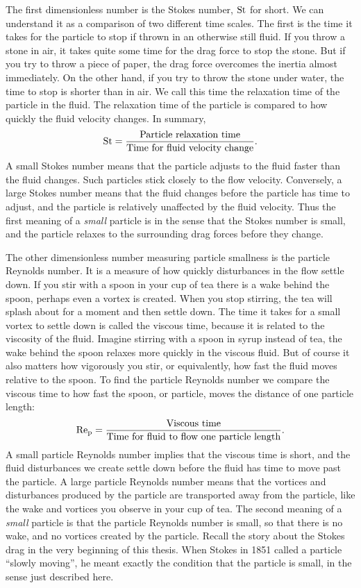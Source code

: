 \documentclass[thesis.tex]{subfiles}
\begin{document}
The first dimensionless number is the Stokes number, $\mbox{St}$ for short. We can understand it as a comparison of two different time scales. The first is the time it takes for the particle to stop if thrown in an otherwise still fluid. If you throw a stone in air, it takes quite some time for the drag force to stop the stone. But if you try to throw a piece of paper, the drag force overcomes the inertia almost immediately. On the other hand, if you try to throw the stone under water, the time to stop is shorter than in air. We call this time the relaxation time of the particle in the fluid. The relaxation time of the particle is compared to how quickly the fluid velocity changes. In summary, 
\begin{align*}
 	\mbox{St} = \frac{\textrm{Particle relaxation time}}{\textrm{Time for fluid velocity change}}.
 \end{align*} 
A small Stokes number means that the particle adjusts to the fluid faster than the fluid changes. Such particles stick closely to the flow velocity. Conversely, a large Stokes number means that the fluid changes before the particle has time to adjust, and the particle is relatively unaffected by the fluid velocity. Thus the first meaning of a \emph{small} particle is in the sense that the Stokes number is small, and the particle relaxes to the surrounding drag forces before they change.

The other dimensionless number measuring particle smallness is the particle Reynolds number. It is a measure of how quickly disturbances in the flow settle down. If you stir with a spoon in your cup of tea there is a wake behind the spoon, perhaps even a vortex is created. When you stop stirring, the tea will splash about for a moment and then settle down. The time it takes for a small vortex to settle down is called the viscous time, because it is related to the viscosity of the fluid. Imagine stirring with a spoon in syrup instead of tea, the wake behind the spoon relaxes more quickly in the viscous fluid. But of course it also matters how vigorously you stir, or equivalently, how fast the fluid moves relative to the spoon. To find the particle Reynolds number we compare the viscous time to how fast the spoon, or particle, moves the distance of one particle length:
\begin{align*}
 	\mbox{Re}_{\mathrm p} = \frac{\textrm{Viscous time}}{\textrm{Time for fluid to flow one particle length}}.
 \end{align*} 
A small particle Reynolds number implies that the viscous time is short, and the fluid disturbances we create settle down before the fluid has time to move past the particle. A large particle Reynolds number means that the vortices and disturbances produced by the particle are transported away from the particle, like the wake and vortices you observe in your cup of tea. The second meaning of a \emph{small} particle is that the particle Reynolds number is small, so that there is no wake, and no vortices created by the particle. 
Recall the story about the Stokes drag in the very beginning of this thesis. When Stokes in 1851 called a particle ``slowly moving'', he meant exactly the condition that the particle is small, in the sense just described here.
\end{document}
